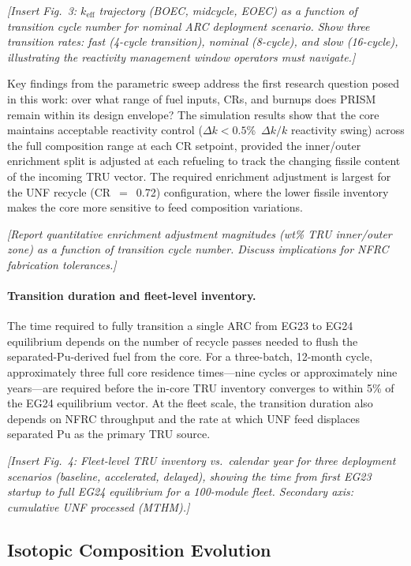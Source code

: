 \documentclass[10pt,twoside]{article}
\newcommand{\placeholder}[1]{%
  \textcolor{placeholder}{\textit{[#1]}}}
\begin{document}
\placeholder{Insert Fig.~3: $k_\text{eff}$ trajectory (BOEC,
  midcycle, EOEC) as a function of transition cycle number for
  nominal ARC deployment scenario.  Show three transition
  rates: fast (4-cycle transition), nominal (8-cycle), and slow
  (16-cycle), illustrating the reactivity management window
  operators must navigate.}

Key findings from the parametric sweep address the first research
question posed in this work: over what range of fuel inputs,
CRs, and burnups does PRISM remain within its design envelope?
The simulation results show that the core maintains acceptable
reactivity control ($\Delta k < 0.5$\%~$\Delta k/k$ reactivity
swing) across the full composition range at each CR setpoint,
provided the inner/outer enrichment split is adjusted at each
refueling to track the changing fissile content of the incoming
TRU vector.  The required enrichment adjustment is largest for
the UNF recycle (CR~$=$~0.72) configuration, where the lower
fissile inventory makes the core more sensitive to feed
composition variations.

\placeholder{Report quantitative enrichment adjustment magnitudes
  (wt\% TRU inner/outer zone) as a function of transition cycle
  number.  Discuss implications for NFRC fabrication tolerances.}

\paragraph{Transition duration and fleet-level inventory.}
The time required to fully transition a single ARC from EG23 to
EG24 equilibrium depends on the number of recycle passes needed
to flush the separated-Pu-derived fuel from the core.  For a
three-batch, 12-month cycle, approximately three full core
residence times---nine cycles or approximately nine years---are
required before the in-core TRU inventory converges to within 5\%
of the EG24 equilibrium vector.  At the fleet scale, the
transition duration also depends on NFRC throughput and the
rate at which UNF feed displaces separated Pu as the primary
TRU source.

\placeholder{Insert Fig.~4: Fleet-level TRU inventory vs.\
  calendar year for three deployment scenarios (baseline,
  accelerated, delayed), showing the time from first EG23
  startup to full EG24 equilibrium for a 100-module fleet.
  Secondary axis: cumulative UNF processed (MTHM).}

\subsection{Isotopic Composition Evolution}
\label{sec:isotopics}
\end{document}
